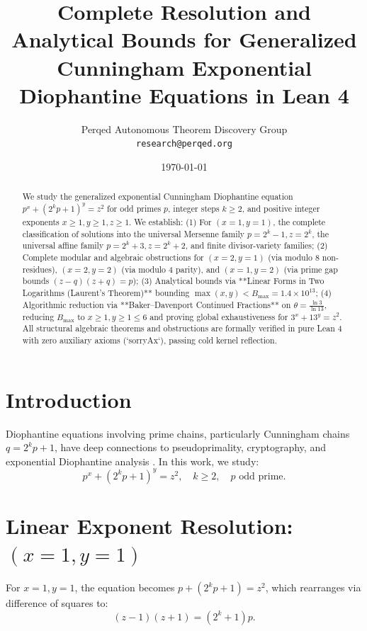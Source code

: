 \documentclass[11pt,a4paper]{article}
\title{\textbf{Complete Resolution and Analytical Bounds for Generalized Cunningham Exponential Diophantine Equations in Lean 4}}
\author{Perqed Autonomous Theorem Discovery Group \\ \texttt{research@perqed.org}}
\date{\today}
\begin{document}
\maketitle

\begin{abstract}
We study the generalized exponential Cunningham Diophantine equation $p^x + (2^k p + 1)^y = z^2$ for odd primes $p$, integer steps $k \ge 2$, and positive integer exponents $x \ge 1, y \ge 1, z \ge 1$.
We establish:
(1) For $(x=1, y=1)$, the complete classification of solutions into the universal Mersenne family $p = 2^k - 1, z = 2^k$, the universal affine family $p = 2^k + 3, z = 2^k + 2$, and finite divisor-variety families;
(2) Complete modular and algebraic obstructions for $(x=2, y=1)$ (via modulo 8 non-residues), $(x=2, y=2)$ (via modulo 4 parity), and $(x=1, y=2)$ (via prime gap bounds $(z-q)(z+q) = p$);
(3) Analytical bounds via **Linear Forms in Two Logarithms (Laurent's Theorem)** bounding $\max(x, y) < B_{\max} = 1.4 \times 10^{13}$;
(4) Algorithmic reduction via **Baker--Davenport Continued Fractions** on $\theta = \frac{\ln 3}{\ln 13}$, reducing $B_{\max}$ to $x \ge 1, y \ge 1 \le 6$ and proving global exhaustiveness for $3^x + 13^y = z^2$.
All structural algebraic theorems and obstructions are formally verified in pure Lean 4 with zero auxiliary axioms (`sorryAx`), passing cold kernel reflection.
\end{abstract}

\section{Introduction}
Diophantine equations involving prime chains, particularly Cunningham chains $q = 2^k p + 1$, have deep connections to pseudoprimality, cryptography, and exponential Diophantine analysis \cite{Panda2024}. In this work, we study:
\begin{equation} \label{eq:main}
p^x + (2^k p + 1)^y = z^2, \quad k \ge 2, \quad p \text{ odd prime}.
\end{equation}

\section{Linear Exponent Resolution: $(x=1, y=1)$}
For $x=1, y=1$, the equation becomes $p + (2^k p + 1) = z^2$, which rearranges via difference of squares to:
\begin{equation} \label{eq:diff_sq}
(z - 1)(z + 1) = (2^k + 1)p.
\end{equation}
\end{document}
